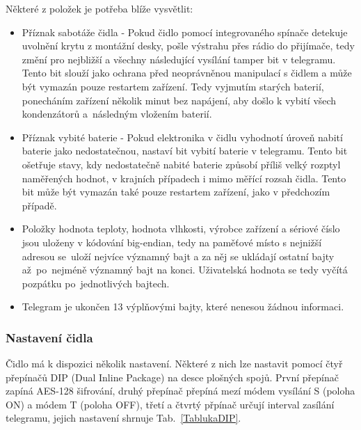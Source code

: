 \newpage{}

Některé z položek je potřeba blíže vysvětlit:

\begin{itemize}
	\item Příznak sabotáže čidla - Pokud čidlo pomocí integrovaného spínače detekuje uvolnění krytu z montážní desky, pošle výstrahu přes rádio do přijímače, tedy změní pro nejbližší a všechny následující vysílání tamper bit v telegramu. Tento bit slouží jako ochrana před neoprávněnou manipulací s čidlem a může být vymazán pouze restartem zařízení. Tedy vyjmutím starých baterií, ponecháním zařízení několik minut bez napájení, aby došlo k vybití všech kondenzátorů a~následným vložením baterií.
\item Příznak vybité baterie - Pokud elektronika v čidlu vyhodnotí úroveň nabití baterie jako nedostatečnou, nastaví bit vybití baterie v telegramu. Tento bit ošetřuje stavy, kdy nedostatečně nabité baterie způsobí příliš velký rozptyl naměřených hodnot, v krajních případech i mimo měřící rozsah čidla. Tento bit může být vymazán také pouze restartem zařízení, jako v předchozím případě.
\item Položky hodnota teploty, hodnota vlhkosti, výrobce zařízení a sériové číslo jsou uloženy v kódování big-endian, tedy na paměťové místo s nejnižší adresou se~uloží nejvíce významný bajt a za něj se ukládají ostatní bajty až~po~nejméně významný bajt na konci. Uživatelská hodnota se tedy vyčítá pozpátku po~jednotlivých bajtech.
\item Telegram je ukončen 13 výplňovými bajty, které nenesou žádnou informaci.
\end{itemize}


\subsubsection{Nastavení čidla}
Čidlo má k dispozici několik nastavení. Některé z nich lze nastavit pomocí čtyř přepínačů DIP (Dual Inline Package) na desce plošných spojů.
První přepínač zapíná AES-128 šifrování, druhý přepínač přepíná mezí módem vysílání S (poloha ON) a módem T (poloha OFF), třetí a čtvrtý přpínač určují interval zasílání telegramu, jejich nastavení shrnuje Tab.~\ref{TablukaDIP}.


